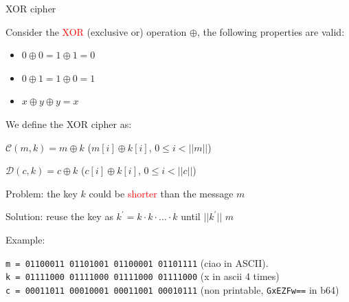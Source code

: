 \begin{frame}{XOR cipher}

  Consider the \textcolor{red}{XOR} (exclusive or) operation $\oplus$, the following properties are valid:
  
  \begin{itemize}
    \item $0 \oplus 0 = 1 \oplus 1 = 0$ 
    \item $0 \oplus 1 = 1 \oplus 0 = 1$ 
    \item $x \oplus y \oplus y = x$ 
  \end{itemize}
  
  \medskip
  \pause
  
  We define the XOR cipher as:
    
  $\mathcal{C}(m, k) = m \oplus k$ \phantom{padding} ($m[i] \oplus k[i]$, $0 \leq i < ||m||$)
  
  $\mathcal{D}(c, k) = c \oplus k$ \phantom{padding} ($c[i] \oplus k[i]$, $0 \leq i < ||c||$)

  \medskip
  
  \pause

  Problem: the key $k$ could be \textcolor{red}{shorter} than the message $m$
  
  Solution: reuse the key as $k^{'} = k \cdot k \cdot \ldots \cdot k$ until $||k^{'}||$ $m$

  \medskip
  \pause
  
  Example:
  
  \texttt{m = 01100011 01101001 01100001 01101111} (ciao in ASCII).\\
  \texttt{k = 01111000 01111000 01111000 01111000} (x in ascii 4 times)\\
  \texttt{c = 00011011 00010001 00011001 00010111} (non printable, \texttt{GxEZFw==} in b64)
  
\end{frame}

